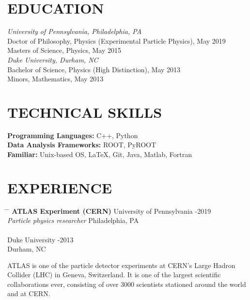\documentclass{res}
\begin{document}
\begin{resume}

 
\section{EDUCATION}          
    {\it University of Pennsylvania, Philadelphia, PA} \\
    Doctor of Philosophy, Physics (Experimental Particle Physics), May 2019 \\
    Masters of Science, Physics, May 2015 \\
    \newline
    {\it Duke University, Durham, NC} \\        
    Bachelor of Science, Physics (High Distinction), May 2013   \\       
    Minors, Mathematics, May 2013 
 
\section{TECHNICAL SKILLS}
    {\bf Programming Languages:} C++, Python\\
    {\bf Data Analysis Frameworks:} ROOT, PyROOT\\
    {\bf Familiar:} Unix-based OS, \LaTeX, Git, Java, Matlab, Fortran

\section{EXPERIENCE}\vspace{-5pt}
   \begin{tabbing}
   \hspace{2.5in}\= \hspace{2.85in} \= \kill %
    {\bf ATLAS Experiment (CERN)} \>University of Pennsylvania -2019\\
    {\it Particle physics researcher} \> Philadelphia, PA \\
    \\
    \> Duke University -2013 \\
    \> Durham, NC
   \end{tabbing}\vspace{-18pt}
   ATLAS is one of the particle detector experiments at CERN's Large Hadron Collider (LHC) in Geneva, Switzerland. 
   It is one of the largest scientific collaborations ever, consisting of over 3000 scientists stationed around the world and at CERN.
   

\end{resume}
\end{document}
